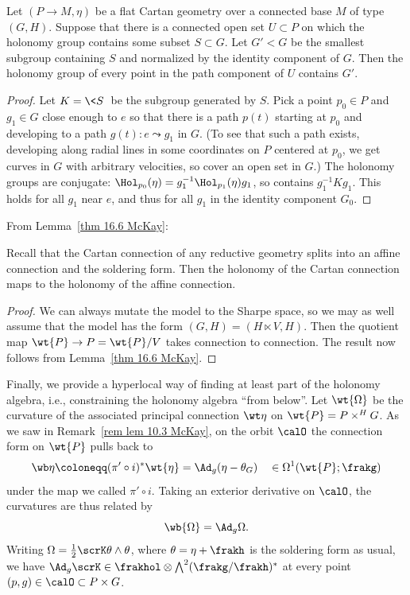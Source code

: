 \begin{thm}\label{thm 16.33 McKay}
    Let $(P\to M,\eta)$ be a flat Cartan geometry over a connected base $M$ of type $(G,H)$. Suppose that there is a connected open set $U\subset P$ on which the holonomy group contains some subset $S\subset G$. Let $G'< G$ be the smallest subgroup containing $S$ and normalized by the identity component of $G$. Then the holonomy group of every point in the path component of $U$ contains $G'$.
\end{thm}
\begin{proof}
    Let $K=\<S\>$ be the subgroup generated by $S$. Pick a point $p_0\in P$ and $g_1\in G$ close enough to $e$ so that there is a path $p(t)$ starting at $p_0$ and developing to a path $g(t):e\leadsto g_1$ in $G$. (To see that such a path exists, developing along radial lines in some coordinates on $P$ centered at $p_0$, we get curves in $G$ with arbitrary velocities, so cover an open set in $G$.) The holonomy groups are conjugate: $\Hol_{p_0}(\eta)=g_1^{-1}\Hol_{p_1}(\eta)g_1$, so contains $g_1^{-1}Kg_1$. This holds for all $g_1$ near $e$, and thus for all $g_1$ in the identity component $G_0$.
\end{proof}

From Lemma~\ref{thm 16.6 McKay}:

\begin{thm}
    Recall that the Cartan connection of any reductive geometry splits into an affine connection and the soldering form. Then the holonomy of the Cartan connection maps to the holonomy of the affine connection.
\end{thm}
\begin{proof}
    We can always mutate the model to the Sharpe space, so we may as well assume that the model has the form $(G,H)=(H\ltimes V,H)$. Then the quotient map $\wt{P}\to P=\wt{P}\slash V$ takes connection to connection. The result now follows from Lemma~\ref{thm 16.6 McKay}.
\end{proof}


Finally, we provide a hyperlocal way of finding at least part of the holonomy algebra, i.e., constraining the holonomy algebra ``from below''. Let $\wt{\Omega}$ be the curvature of the associated principal connection $\wt\eta$ on $\wt{P}=P\times^H G$. As we saw in Remark~\ref{rem lem 10.3 McKay}, on the orbit $\calO$ the connection form on $\wt{P}$ pulls back to 
\[\wb\eta\coloneqq (\pi'\circ i)^\ast \wt{\eta}= \Ad_g(\eta-\theta_G) \quad \in \Omega^1(\wt{P};\frakg)\]
under the map we called $\pi'\circ i$. Taking an exterior derivative on $\calO$, the curvatures are thus related by 
\[\wb{\Omega}=\Ad_g \Omega.\]
Writing $\Omega=\frac12\scrK \theta\wedge\theta$, where $\theta=\eta+\frakh$ is the soldering form as usual, we have $\Ad_g \scrK\in\frakhol \otimes\bigwedge\nolimits^2(\frakg\slash\frakh)^\ast$ at every point $(p,g)\in \calO\subset P\times G$.

